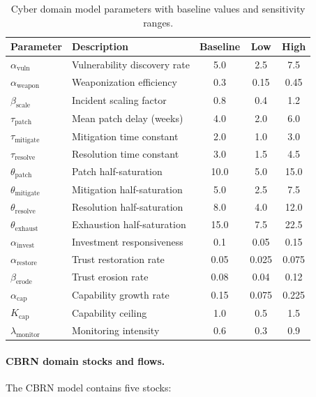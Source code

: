 \documentclass[11pt]{article}
\begin{document}
\begin{table}[t]
\centering
\caption{Cyber domain model parameters with baseline values and sensitivity ranges.}
\label{tab:cyber_params}
\small
\begin{tabular}{@{}llccc@{}}
\toprule
\textbf{Parameter} & \textbf{Description} & \textbf{Baseline} & \textbf{Low} & \textbf{High} \\
\midrule
$\alpha_{\text{vuln}}$ & Vulnerability discovery rate & 5.0 & 2.5 & 7.5 \\
$\alpha_{\text{weapon}}$ & Weaponization efficiency & 0.3 & 0.15 & 0.45 \\
$\beta_{\text{scale}}$ & Incident scaling factor & 0.8 & 0.4 & 1.2 \\
$\tau_{\text{patch}}$ & Mean patch delay (weeks) & 4.0 & 2.0 & 6.0 \\
$\tau_{\text{mitigate}}$ & Mitigation time constant & 2.0 & 1.0 & 3.0 \\
$\tau_{\text{resolve}}$ & Resolution time constant & 3.0 & 1.5 & 4.5 \\
$\theta_{\text{patch}}$ & Patch half-saturation & 10.0 & 5.0 & 15.0 \\
$\theta_{\text{mitigate}}$ & Mitigation half-saturation & 5.0 & 2.5 & 7.5 \\
$\theta_{\text{resolve}}$ & Resolution half-saturation & 8.0 & 4.0 & 12.0 \\
$\theta_{\text{exhaust}}$ & Exhaustion half-saturation & 15.0 & 7.5 & 22.5 \\
$\alpha_{\text{invest}}$ & Investment responsiveness & 0.1 & 0.05 & 0.15 \\
$\alpha_{\text{restore}}$ & Trust restoration rate & 0.05 & 0.025 & 0.075 \\
$\beta_{\text{erode}}$ & Trust erosion rate & 0.08 & 0.04 & 0.12 \\
$\alpha_{\text{cap}}$ & Capability growth rate & 0.15 & 0.075 & 0.225 \\
$K_{\text{cap}}$ & Capability ceiling & 1.0 & 0.5 & 1.5 \\
$\lambda_{\text{monitor}}$ & Monitoring intensity & 0.6 & 0.3 & 0.9 \\
\bottomrule
\end{tabular}
\end{table}

\paragraph{CBRN domain stocks and flows.} The CBRN model contains five stocks:
\end{document}
